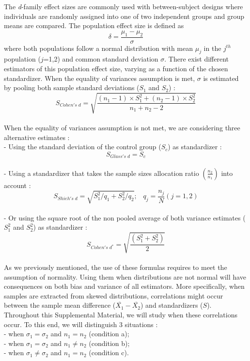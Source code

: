 \documentclass[
  english,
  man,mask,floatsintext]{apa6}
\begin{document}
The \emph{d}-family effect sizes are commonly used with between-subject designs where individuals are randomly assigned into one of two independent groups and group means are compared. The population effect size is defined as
\begin{equation*} 
\delta = \frac{\mu_{1}-\mu_{2}}{\sigma} 
\label{eq:Cohendelta}
\end{equation*}
where both populations follow a normal distribution with mean \(\mu_j\) in the \(j^{th}\) population (\(j\)=1,2) and common standard deviation \(\sigma\). There exist different estimators of this population effect size, varying as a function of the chosen standardizer. When the equality of variances assumption is met, \(\sigma\) is estimated by pooling both sample standard deviations (\(S_1\) and \(S_2\)) :
\begin{equation*} 
S_{Cohen's \; d} = \sqrt{\frac{(n_1-1) \times S_1^2+(n_2-1) \times S_2^2}{n_1+n_2-2}}
\label{eq:Cohends}
\end{equation*}\\
When the equality of variances assumption is not met, we are considering three alternative estimates :\\
- Using the standard deviation of the control group (\(S_c\)) as standardizer :
\begin{equation*} 
S_{Glass's \; d} = S_{c}
\label{eq:Glassds}
\end{equation*}\\
- Using a standardizer that takes the sample sizes allocation ratio \(\left( \frac{n_2}{n_1}\right)\) into account :\\
\begin{equation*}  
S_{Shieh's \; d} = \sqrt{S_1^2/q_1+S_2^2/q_2}; \;\;\; q_j=\frac{n_j}{N} (j=1,2)
\label{eq:Shiehds}
\end{equation*}\\
- Or using the square root of the non pooled average of both variance estimates (\(S^2_1\) and \(S^2_2\)) as standardizer :
\begin{equation*} 
S_{Cohen's \; d^*} = \sqrt{\frac{\left(S^2_{1}+S^2_{2} \right)}{2}}
\label{eq:cohenprimeds}
\end{equation*}\\
As we previously mentioned, the use of these formulas requires to meet the assumption of normality. Using them when distributions are not normal will have consequences on both bias and variance of all estimators. More specifically, when samples are extracted from skewed distributions, correlations might occur between the sample mean difference (\(\bar{X_1}-\bar{X_2}\)) and standardizers (\(S\)). Throughout this Supplemental Material, we will study when these correlations occur. To this end, we will distinguish 3 situations :\\
- when \(\sigma_1=\sigma_2\) and \(n_1=n_2\) (condition a);\\
- when \(\sigma_1=\sigma_2\) and \(n_1\neq n_2\) (condition b);\\
- when \(\sigma_1 \neq \sigma_2\) and \(n_1 = n_2\) (condition c).
\end{document}
